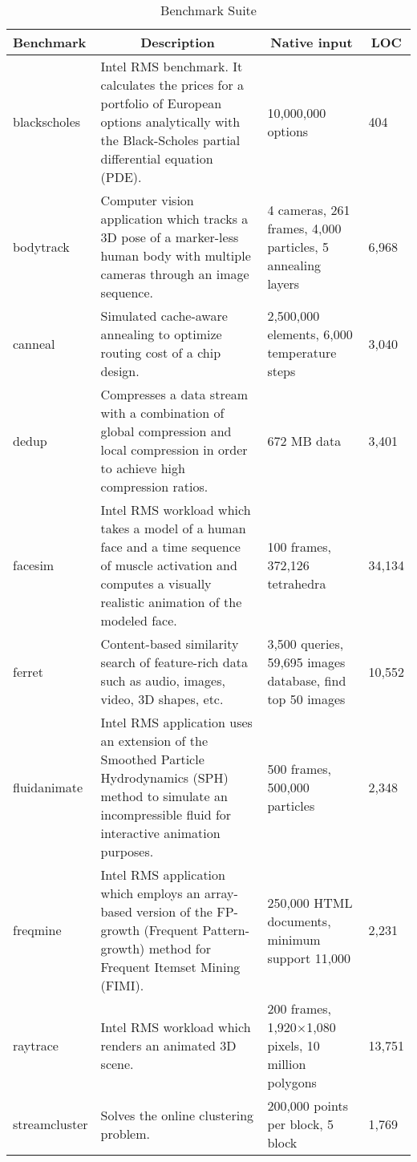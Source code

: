 
\begin{table*}[!t]
	\centering
	\scriptsize
	\caption{\PARSEC{} Benchmark Suite}
	\begin{tabular}{|l|p{6cm}|p{3cm}|p{1cm}|}
	\hline
	\textbf{Benchmark} & \multicolumn{1}{|c|}{\textbf{Description}} & \multicolumn{1}{|c|}{\textbf{Native input}} & \multicolumn{1}{|c|}{\textbf{LOC}}\\
	\hline \hline
	blackscholes & Intel RMS benchmark. It calculates the prices for a portfolio of European options analytically with the Black-Scholes partial differential equation (PDE). & 10,000,000 options & 404 \\ \hline
	bodytrack & Computer vision application which tracks a 3D pose of a marker-less human body with multiple cameras through an image sequence. & 4 cameras, 261 frames, 4,000 particles, 5 annealing layers & 6,968\\ \hline
	canneal & Simulated cache-aware annealing to optimize routing cost of a chip design. & 2,500,000 elements, 6,000 temperature steps & 3,040\\ \hline
	dedup & Compresses a data stream with a combination of global compression and local compression in order to achieve high compression ratios. & 672 MB data & 3,401\\ \hline
	facesim & Intel RMS workload which takes a model of a human face and a time sequence of muscle activation and computes a visually realistic animation of the modeled face. & 100 frames, 372,126 tetrahedra & 34,134\\ \hline
	ferret & Content-based similarity search of feature-rich data such as audio, images, video, 3D shapes, etc. & 3,500 queries, 59,695 images database, find top 50 images & 10,552\\ \hline
	fluidanimate & Intel RMS application uses an extension of the Smoothed Particle Hydrodynamics (SPH) method to simulate an incompressible fluid for interactive animation purposes. & 500 frames, 500,000 particles & 2,348\\ \hline
	freqmine & Intel RMS application which employs an array-based version of the FP-growth (Frequent Pattern-growth) method for Frequent Itemset Mining (FIMI). & 250,000 HTML documents, minimum support 11,000 & 2,231\\ \hline
	raytrace & Intel RMS workload which renders an animated 3D scene. & 200 frames, 1,920$\times$1,080 pixels, 10 million polygons & 13,751\\ \hline
	streamcluster & Solves the online clustering problem. & 200,000 points per block, 5 block & 1,769\\ \hline

\end{tabular}
\end{table*}
